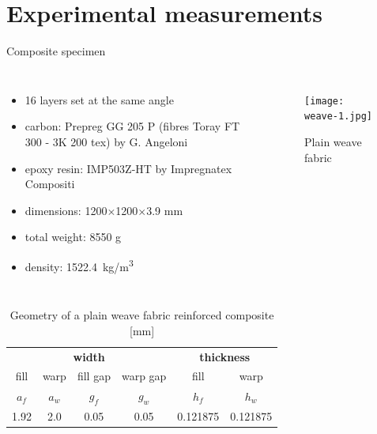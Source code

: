 \documentclass[10pt]{beamer} %
\begin{document}
\section{Experimental measurements}
\begin{frame}[t,label=frame12]{Composite specimen}
\begin{columns}[T]
	{\small
			\begin{itemize}
			\item 16 layers set at the same angle \\
			\item carbon: Prepreg GG 205  P (fibres Toray FT 300 - 3K 200 tex) by G. Angeloni 
			\item epoxy resin: IMP503Z-HT by Impregnatex Compositi 
			\item dimensions: 1200$\times$1200$\times$3.9 mm\\
			\item total weight:  8550 g
			\item density: 1522.4~kg/m\textsuperscript{3}
		\end{itemize}
	}
	\begin{figure}
		\texttt{[image: weave-1.jpg]}
		\caption{Plain weave fabric}
	\end{figure}
	\end{columns}
\begin{table}[h]
	\renewcommand{\arraystretch}{1.1}
	\centering \footnotesize
	\caption{Geometry of a plain weave fabric reinforced composite [mm]}
	\begin{tabular}{cccccc} 
		\toprule
		\multicolumn{4}{c}{\textbf{width} }	& \multicolumn{2}{c}{\textbf{thickness} }  \\ 
		\cmidrule(lr){1-4} \cmidrule(lr){5-6} 
		fill & warp & fill gap& warp gap& fill & warp\\
		$a_f$ &$a_w$& $g_f$  & $g_w$  & $h_f$& $h_w$ \\ 
		\cmidrule(lr){1-2} \cmidrule(lr){3-4} \cmidrule(lr){5-6}
		1.92 &2.0& 0.05& 0.05 & 0.121875 & 0.121875 \\
		\bottomrule 
	\end{tabular} 
	\label{tab:weave_geo}
\end{table}
\end{frame}
\end{document}
